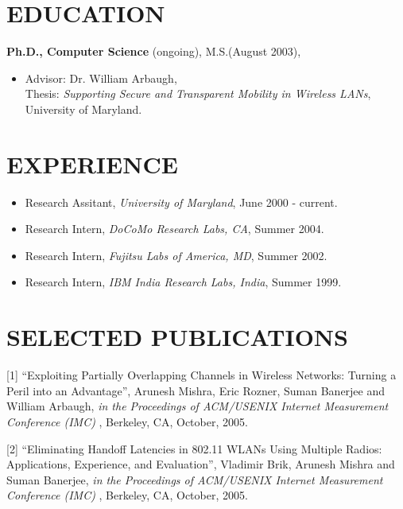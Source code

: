\begin{resume}
\vspace{0.1in}

\section{EDUCATION}
\vspace{0.1in} 
{\bf Ph.D., Computer Science}  (ongoing), M.S.(August 2003),
    \begin{itemize}
         \item[] Advisor: Dr. William Arbaugh, \\
		 Thesis: {\em Supporting Secure and Transparent Mobility in Wireless LANs}, \\
                 University of Maryland.
    \end{itemize}

\section{EXPERIENCE} 
\vspace{0.1in}
    \begin{itemize}
         \item[] Research Assitant, {\em University of Maryland}, June 2000 - current.
         \item[] Research Intern, {\em DoCoMo Research Labs, CA}, Summer 2004.
         \item[] Research Intern, {\em Fujitsu Labs of America, MD}, Summer 2002.
         \item[] Research Intern, {\em IBM India Research Labs, India}, Summer 1999.
     \end{itemize}

\section{SELECTED PUBLICATIONS}
\vspace{0.5cm}

[1] ``Exploiting Partially Overlapping Channels in Wireless Networks: Turning a Peril into an Advantage'',
Arunesh Mishra, Eric Rozner, Suman Banerjee and William Arbaugh, {\em in the Proceedings of ACM/USENIX Internet Measurement Conference (IMC)}
, Berkeley, CA, October, 2005.

[2] ``Eliminating Handoff Latencies in 802.11 WLANs Using Multiple Radios: Applications, Experience, and Evaluation'', 
Vladimir Brik, Arunesh Mishra and Suman Banerjee, {\em in the Proceedings of ACM/USENIX Internet Measurement Conference (IMC)}
, Berkeley, CA, October, 2005.


\end{resume}

